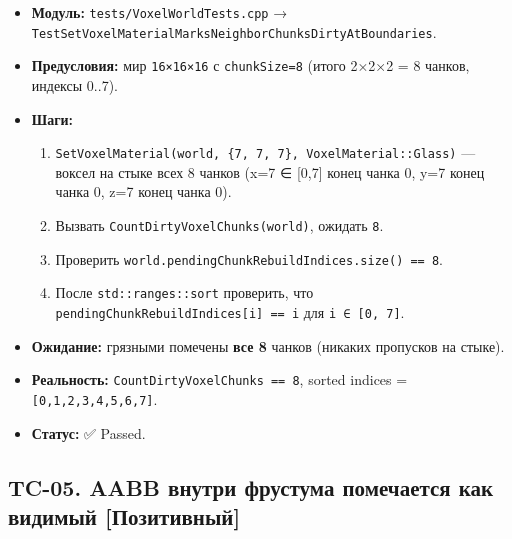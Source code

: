 \begin{itemize}
\tightlist
\item
  \textbf{Модуль:} \texttt{tests/VoxelWorldTests.cpp} → \texttt{TestSetVoxelMaterialMarksNeighborChunksDirtyAtBoundaries}.
\item
  \textbf{Предусловия:} мир \texttt{16×16×16} с \texttt{chunkSize=8} (итого 2×2×2 = 8 чанков, индексы 0..7).
\item
  \textbf{Шаги:}

  \begin{enumerate}
  \def\labelenumi{\arabic{enumi}.}
  \tightlist
  \item
    \texttt{SetVoxelMaterial(world,\ \{7,\ 7,\ 7\},\ VoxelMaterial::Glass)} --- воксел на стыке всех 8 чанков (x=7 ∈ {[}0,7{]} конец чанка 0, y=7 конец чанка 0, z=7 конец чанка 0).
  \item
    Вызвать \texttt{CountDirtyVoxelChunks(world)}, ожидать \texttt{8}.
  \item
    Проверить \texttt{world.pendingChunkRebuildIndices.size()\ ==\ 8}.
  \item
    После \texttt{std::ranges::sort} проверить, что \texttt{pendingChunkRebuildIndices{[}i{]}\ ==\ i} для \texttt{i\ ∈\ {[}0,\ 7{]}}.
  \end{enumerate}
\item
  \textbf{Ожидание:} грязными помечены \textbf{все 8} чанков (никаких пропусков на стыке).
\item
  \textbf{Реальность:} \texttt{CountDirtyVoxelChunks\ ==\ 8}, sorted indices = \texttt{{[}0,1,2,3,4,5,6,7{]}}.
\item
  \textbf{Статус:} ✅ Passed.
\end{itemize}

\subsection{TC-05. AABB внутри фрустума помечается как видимый {[}Позитивный{]}}\label{KT-2.2_Test_Report-tc-05-aabb-ux432ux43dux443ux442ux440ux438-ux444ux440ux443ux441ux442ux443ux43cux430-ux43fux43eux43cux435ux447ux430ux435ux442ux441ux44f-ux43aux430ux43a-ux432ux438ux434ux438ux43cux44bux439-ux43fux43eux437ux438ux442ux438ux432ux43dux44bux439}

